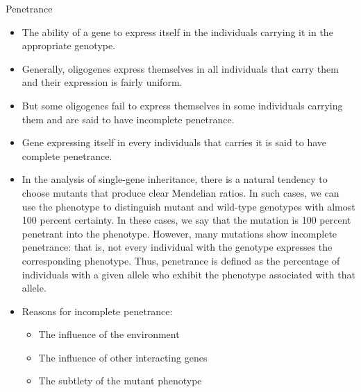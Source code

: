 \documentclass[11pt,ignorenonframetext,aspectratio=169]{beamer}
\providecommand{\tightlist}{%
  \setlength{\itemsep}{0pt}\setlength{\parskip}{0pt}}
\begin{document}
\begin{frame}{Penetrance}
\protect\hypertarget{penetrance}{}
\footnotesize

\begin{itemize}
\tightlist
\item
  The ability of a gene to express itself in the individuals carrying it
  in the appropriate genotype.
\item
  Generally, oligogenes express themselves in all individuals that carry
  them and their expression is fairly uniform.
\item
  But some oligogenes fail to express themselves in some individuals
  carrying them and are said to have incomplete penetrance.
\item
  Gene expressing itself in every individuals that carries it is said to
  have complete penetrance.
\item
  In the analysis of single-gene inheritance, there is a natural
  tendency to choose mutants that produce clear Mendelian ratios. In
  such cases, we can use the phenotype to distinguish mutant and
  wild-type genotypes with almost 100 percent certainty. In these cases,
  we say that the mutation is 100 percent penetrant into the phenotype.
  However, many mutations show incomplete penetrance: that is, not every
  individual with the genotype expresses the corresponding phenotype.
  Thus, penetrance is defined as the percentage of individuals with a
  given allele who exhibit the phenotype associated with that allele.
\item
  Reasons for incomplete penetrance:

  \begin{itemize}
  \footnotesize
  \item The influence of the environment
  \item The influence of other interacting genes
  \item The subtlety of the mutant phenotype
  \end{itemize}
\end{itemize}
\end{frame}
\end{document}
